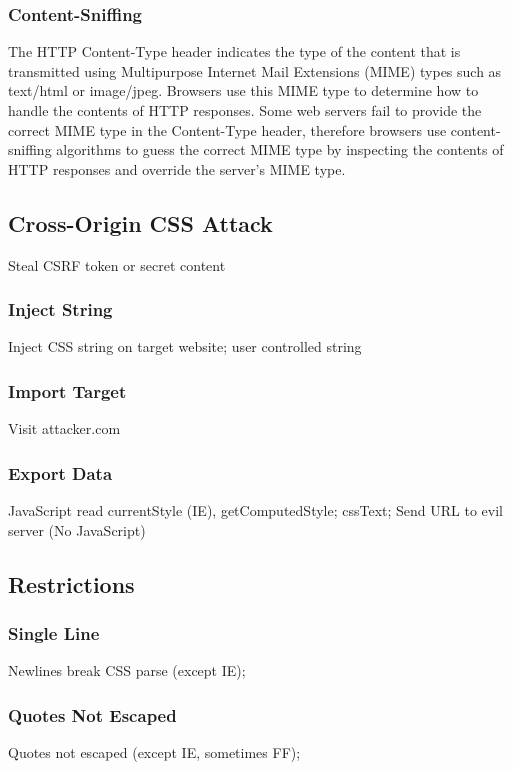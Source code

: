 \documentclass{acm_proc_article-sp}
\begin{document}
\subsubsection{Content-Sniffing}
The HTTP Content-Type header indicates the type of the content that is transmitted using Multipurpose Internet Mail Extensions (MIME)\cite{mime} types such as text/html or image/jpeg. Browsers use this MIME type to determine how to handle the contents of HTTP responses. Some web servers fail to provide the correct MIME type in the Content-Type header, therefore browsers use content-sniffing algorithms to guess the correct MIME type by inspecting the contents of HTTP responses and override the server's MIME type. 

\subsection{Cross-Origin CSS Attack}
Steal CSRF token or secret content

\subsubsection{Inject String}
Inject CSS string on target website;
user controlled string

\subsubsection{Import Target}
Visit attacker.com

\subsubsection{Export Data}
JavaScript read currentStyle (IE), getComputedStyle;
cssText;
Send URL to evil server (No JavaScript)

\subsection{Restrictions}

\subsubsection{Single Line}
Newlines break CSS parse (except IE);

\subsubsection{Quotes Not Escaped}
Quotes not escaped (except IE, sometimes FF);
\end{document}
